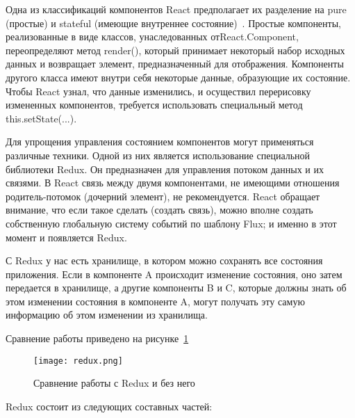 Одна из классификаций компонентов React предполагает их разделение на pure (простые) и stateful (имеющие внутреннее
состояние)~\cite{react}. Простые компоненты, реализованные в виде классов, унаследованных от\linebreak React.Component,
переопределяют метод render(), который принимает некоторый набор исходных данных и возвращает элемент,
предназначенный для отображения. Компоненты другого класса имеют внутри себя некоторые данные, образующие их состояние.
Чтобы React узнал, что данные изменились, и осуществил перерисовку измененных компонентов, требуется использовать
специальный метод this.setState(...). 

Для упрощения управления состоянием компонентов могут применяться различные техники. Одной из них является использование
специальной библиотеки Redux. Он предназначен для управления потоком данных и их связями. В React связь между двумя
компонентами, не имеющими отношения родитель-потомок (дочерний элемент), не рекомендуется. React обращает внимание,
что если такое сделать (создать связь), можно вполне создать собственную глобальную систему событий по шаблону Flux;
и именно в этот момент и появляется Redux.

С Redux у нас есть хранилище, в котором можно сохранять все состояния приложения. Если в компоненте A происходит
изменение состояния, оно затем передается в хранилище, а другие компоненты B и C, которые должны знать об этом
изменении состояния в компоненте A, могут получать эту самую информацию об этом изменении из хранилища.

Сравнение работы приведено на рисунке~\ref{fig:design:client:technologies:redux}

\begin{figure}[!ht]
	\centering
	\texttt{[image: redux.png]} 
	\caption{Сравнение работы с Redux и без него}
	\label{fig:design:client:technologies:redux}
\end{figure}

Redux состоит из следующих составных частей:

